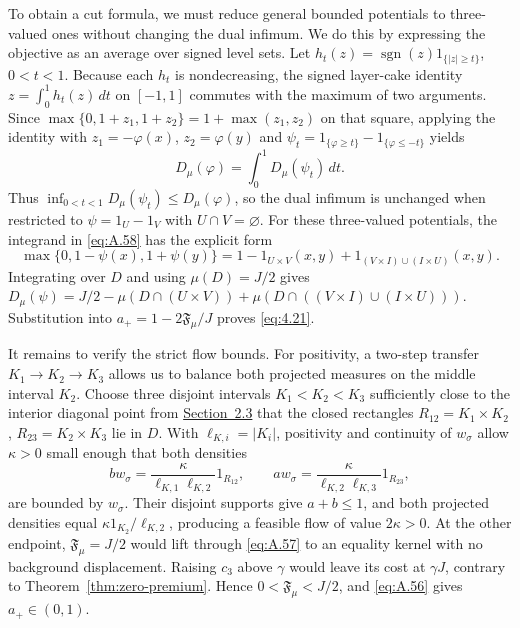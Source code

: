 To obtain a cut formula, we must reduce general bounded potentials to three-valued ones without changing the dual infimum. We do this by expressing the objective as an average over signed level sets. Let \(h_t(z)=\operatorname{sgn}(z)1_{\{|z|\ge t\}}\), \(0<t<1\). Because each \(h_t\) is nondecreasing, the signed layer-cake identity \(z=\int_0^1h_t(z)\,dt\) on \([-1,1]\) commutes with the maximum of two arguments. Since \(\max\{0,1+z_1,1+z_2\}=1+\max(z_1,z_2)\) on that square, applying the identity with \(z_1=-\varphi(x)\), \(z_2=\varphi(y)\) and \(\psi_t=1_{\{\varphi\ge t\}}-1_{\{\varphi\le-t\}}\) yields
\begin{equation}
D_\mu(\varphi)=\int_0^1D_\mu(\psi_t)\,dt.
\tag{A.59}\label{eq:A.59}
\end{equation}
Thus \(\inf_{0<t<1}D_\mu(\psi_t)\le D_\mu(\varphi)\), so the dual infimum is unchanged when restricted to \(\psi=1_U-1_V\) with \(U\cap V=\varnothing\). For these three-valued potentials, the integrand in \eqref{eq:A.58} has the explicit form
\[
\max\{0,1-\psi(x),1+\psi(y)\}
=1-1_{U\times V}(x,y)+1_{(V\times I)\cup(I\times U)}(x,y).
\]
Integrating over \(D\) and using \(\mu(D)=J/2\) gives \(D_\mu(\psi)=J/2-\mu(D\cap(U\times V))+\mu(D\cap((V\times I)\cup(I\times U)))\). Substitution into \(a_+=1-2\mathfrak F_\mu/J\) proves \eqref{eq:4.21}.

It remains to verify the strict flow bounds. For positivity, a two-step transfer \(K_1\to K_2\to K_3\) allows us to balance both projected measures on the middle interval \(K_2\). Choose three disjoint intervals \(K_1<K_2<K_3\) sufficiently close to the interior diagonal point from \hyperref[geometry:interior-diagonal]{Section~2.3} that the closed rectangles \(R_{12}=K_1\times K_2\), \(R_{23}=K_2\times K_3\) lie in \(D\). With \(\ell_{K,i}=|K_i|\), positivity and continuity of \(w_\sigma\) allow \(\kappa>0\) small enough that both densities
\[
bw_\sigma=\frac{\kappa}{\ell_{K,1}\ell_{K,2}}1_{R_{12}},
\qquad aw_\sigma=\frac{\kappa}{\ell_{K,2}\ell_{K,3}}1_{R_{23}},
\]
are bounded by \(w_\sigma\). Their disjoint supports give \(a+b\le1\), and both projected densities equal \(\kappa1_{K_2}/\ell_{K,2}\), producing a feasible flow of value \(2\kappa>0\). At the other endpoint, \(\mathfrak F_\mu=J/2\) would lift through \eqref{eq:A.57} to an equality kernel with no background displacement. Raising \(c_3\) above \(\gamma\) would leave its cost at \(\gamma J\), contrary to Theorem~\ref{thm:zero-premium}. Hence \(0<\mathfrak F_\mu<J/2\), and \eqref{eq:A.56} gives \(a_+\in(0,1)\). \unskip\nobreak\hfill\proofbox

